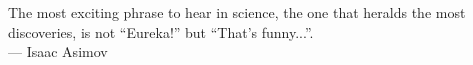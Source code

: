 \thispagestyle{empty}

\vspace*{3cm}

\begin{center}
    The most exciting phrase to hear in science, the one that heralds the most discoveries, is not ``Eureka!'' but ``That's funny...''. \\ \medskip
    --- Isaac Asimov
\end{center}